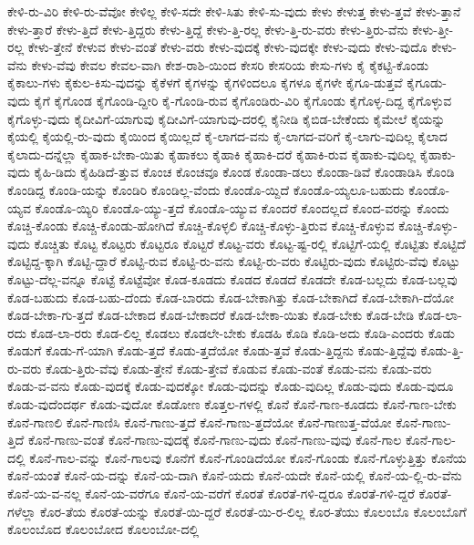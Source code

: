{ಕೇಳಿ-ರು-ವಿರಿ
ಕೇಳಿ-ರು-ವೆವೋ
ಕೇಳಿಲ್ಲ
ಕೇಳಿ-ಸದೇ
ಕೇಳಿ-ಸಿತು
ಕೇಳಿ-ಸು-ವುದು
ಕೇಳು
ಕೇಳುತ್ತ
ಕೇಳು-ತ್ತವೆ
ಕೇಳು-ತ್ತಾನೆ
ಕೇಳು-ತ್ತಾರೆ
ಕೇಳು-ತ್ತಿದೆ
ಕೇಳು-ತ್ತಿದ್ದರು
ಕೇಳು-ತ್ತಿದ್ದೆ
ಕೇಳು-ತ್ತಿ-ರಲ್ಲ
ಕೇಳು-ತ್ತಿ-ರು-ವರು
ಕೇಳು-ತ್ತಿರು-ವೆನು
ಕೇಳು-ತ್ತೀ-ರಲ್ಲ
ಕೇಳು-ತ್ತೇನೆ
ಕೇಳುವ
ಕೇಳು-ವಂತೆ
ಕೇಳು-ವರು
ಕೇಳು-ವುದಕ್ಕೆ
ಕೇಳು-ವುದಕ್ಕೇ
ಕೇಳು-ವುದು
ಕೇಳು-ವುದೊ
ಕೇಳು-ವೆನು
ಕೇಳು-ವೆವು
ಕೇವಲ
ಕೇವಲ-ವಾಗಿ
ಕೇಶ-ರಾಶಿ-ಯಿಂದ
ಕೇಸರಿ
ಕೇಸರಿಯ
ಕೇಸು-ಗಳು
ಕೈ
ಕೈಕಟ್ಟಿ-ಕೊಂಡು
ಕೈಕಾಲು-ಗಳು
ಕೈಕುಲ-ಕಿಸು-ವುದನ್ನು
ಕೈಕೆಳಗೆ
ಕೈಗಳನ್ನು
ಕೈಗಳಿಂದಲೂ
ಕೈಗಳೂ
ಕೈಗಳೇ
ಕೈಗೂ-ಡುತ್ತವೆ
ಕೈಗೂಡು-ವುದು
ಕೈಗೆ
ಕೈಗೊಂಡ
ಕೈಗೊಂಡಿ-ದ್ದೀರಿ
ಕೈ-ಗೊಂಡಿ-ರುವ
ಕೈಗೊಂಡಿರು-ವಿರಿ
ಕೈಗೊಂಡು
ಕೈಗೊಳ್ಳ-ದಿದ್ದ
ಕೈಗೊಳ್ಳುವ
ಕೈಗೊಳ್ಳು-ವುದು
ಕೈದೀವಿಗೆ-ಯಾಗುವು
ಕೈದೀವಿಗೆ-ಯಾಗುವು-ದರಲ್ಲಿ
ಕೈನೀಡಿ
ಕೈಬಿಡ-ಬೇಕೆಂದು
ಕೈಮೇಲೆ
ಕೈಯನ್ನು
ಕೈಯಲ್ಲಿ
ಕೈಯಲ್ಲಿ-ರು-ವುದು
ಕೈಯಿಂದ
ಕೈಯಿಲ್ಲದೆ
ಕೈ-ಲಾಗದ-ವನು
ಕೈ-ಲಾಗದ-ವರಿಗೆ
ಕೈ-ಲಾಗು-ವುದಿಲ್ಲ
ಕೈಲಾದ
ಕೈಲಾದು-ದನ್ನೆಲ್ಲಾ
ಕೈಹಾಕ-ಬೇಕಾ-ಯಿತು
ಕೈಹಾಕಲು
ಕೈಹಾಕಿ
ಕೈಹಾಕಿ-ದರೆ
ಕೈಹಾಕಿ-ರುವ
ಕೈಹಾಕು-ವುದಿಲ್ಲ
ಕೈಹಾಕು-ವುದು
ಕೈಹಿ-ಡಿದು
ಕೈಹಿಡಿದೆ-ತ್ತುವ
ಕೊಂಚ
ಕೊಂಚವೂ
ಕೊಂಡ
ಕೊಂಡಾ-ಡಲು
ಕೊಂಡಾ-ಡಿವೆ
ಕೊಂಡಾಡಿಸಿ
ಕೊಂಡಿ
ಕೊಂಡಿದ್ದ
ಕೊಂಡಿ-ಯನ್ನು
ಕೊಂಡಿರಿ
ಕೊಂಡಿಲ್ಲ-ವೆಂದು
ಕೊಂಡೊ-ಯ್ದಿದೆ
ಕೊಂಡೊ-ಯ್ಯಲೂ-ಬಹುದು
ಕೊಂಡೊ-ಯ್ಯವ
ಕೊಂಡೊ-ಯ್ಯಿರಿ
ಕೊಂಡೊ-ಯ್ಯು-ತ್ತದೆ
ಕೊಂಡೊ-ಯ್ಯುವ
ಕೊಂದರೆ
ಕೊಂದಲ್ಲದೆ
ಕೊಂದ-ವರನ್ನು
ಕೊಂದು
ಕೊಚ್ಚಿ-ಕೊಂಡು
ಕೊಚ್ಚಿ-ಕೊಂಡು-ಹೋಗಿದೆ
ಕೊಚ್ಚಿ-ಕೊಳ್ಳಲಿ
ಕೊಚ್ಚಿ-ಕೊಳ್ಳು-ತ್ತಿರುವ
ಕೊಚ್ಚಿ-ಕೊಳ್ಳುವ
ಕೊಚ್ಚಿ-ಕೊಳ್ಳು-ವುದು
ಕೊಚ್ಚಿತು
ಕೊಟ್ಟ
ಕೊಟ್ಟರು
ಕೊಟ್ಟರೂ
ಕೊಟ್ಟರೆ
ಕೊಟ್ಟ-ವರು
ಕೊಟ್ಟ-ಷ್ಟ-ರಲ್ಲಿ
ಕೊಟ್ಟಿಗೆ-ಯಲ್ಲಿ
ಕೊಟ್ಟಿತು
ಕೊಟ್ಟಿದೆ
ಕೊಟ್ಟಿದ್ದ-ಕ್ಕಾಗಿ
ಕೊಟ್ಟಿ-ದ್ದಾರೆ
ಕೊಟ್ಟಿ-ರುವ
ಕೊಟ್ಟಿ-ರು-ವನು
ಕೊಟ್ಟಿ-ರು-ವರು
ಕೊಟ್ಟಿರು-ವುದು
ಕೊಟ್ಟಿರು-ವೆವು
ಕೊಟ್ಟು
ಕೊಟ್ಟು-ದೆಲ್ಲ-ವನ್ನೂ
ಕೊಟ್ಟೆ
ಕೊಟ್ಟೆವೋ
ಕೊಡ-ಕೂಡದು
ಕೊಡದ
ಕೊಡದೆ
ಕೊಡದೇ
ಕೊಡ-ಬಲ್ಲದು
ಕೊಡ-ಬಲ್ಲವು
ಕೊಡ-ಬಹುದು
ಕೊಡ-ಬಹು-ದೆಂದು
ಕೊಡ-ಬಾರದು
ಕೊಡ-ಬೇಕಾಗಿತ್ತು
ಕೊಡ-ಬೇಕಾಗಿದೆ
ಕೊಡ-ಬೇಕಾಗಿ-ದೆಯೋ
ಕೊಡ-ಬೇಕಾ-ಗು-ತ್ತದೆ
ಕೊಡ-ಬೇಕಾದ
ಕೊಡ-ಬೇಕಾದರೆ
ಕೊಡ-ಬೇಕಾ-ಯಿತು
ಕೊಡ-ಬೇಕು
ಕೊಡ-ಬೇಡಿ
ಕೊಡ-ಲಾ-ರದು
ಕೊಡ-ಲಾ-ರರು
ಕೊಡ-ಲಿಲ್ಲ
ಕೊಡಲು
ಕೊಡಲೇ-ಬೇಕು
ಕೊಡಹಿ
ಕೊಡಿ
ಕೊಡಿ-ಅದು
ಕೊಡಿ-ಎಂದರು
ಕೊಡು
ಕೊಡುಗೆ
ಕೊಡು-ಗೆ-ಯಾಗಿ
ಕೊಡು-ತ್ತದೆ
ಕೊಡು-ತ್ತದೆಯೋ
ಕೊಡು-ತ್ತವೆ
ಕೊಡು-ತ್ತಿದ್ದನು
ಕೊಡು-ತ್ತಿದ್ದೆವು
ಕೊಡು-ತ್ತಿ-ರು-ವರು
ಕೊಡು-ತ್ತಿರು-ವೆವು
ಕೊಡು-ತ್ತೇನೆ
ಕೊಡು-ತ್ತೇವೆ
ಕೊಡುವ
ಕೊಡು-ವಂತೆ
ಕೊಡು-ವನು
ಕೊಡು-ವರು
ಕೊಡು-ವ-ವನು
ಕೊಡು-ವುದಕ್ಕೆ
ಕೊಡು-ವುದಕ್ಕೋ
ಕೊಡು-ವುದನ್ನು
ಕೊಡು-ವುದಿಲ್ಲ
ಕೊಡು-ವುದು
ಕೊಡು-ವುದೂ
ಕೊಡು-ವುದೆಂದರ್ಥ
ಕೊಡು-ವುದೋ
ಕೊಡೋಣ
ಕೊತ್ತಲ-ಗಳಲ್ಲಿ
ಕೊನೆ
ಕೊನೆ-ಗಾಣ-ಕೂಡದು
ಕೊನೆ-ಗಾಣ-ಬೇಕು
ಕೊನೆ-ಗಾಣಲಿ
ಕೊನೆ-ಗಾಣಿಸಿ
ಕೊನೆ-ಗಾಣು-ತ್ತದೆ
ಕೊನೆ-ಗಾಣು-ತ್ತದೆಯೋ
ಕೊನೆ-ಗಾಣುತ್ತ-ವೆಯೋ
ಕೊನೆ-ಗಾಣು-ತ್ತಿದೆ
ಕೊನೆ-ಗಾಣು-ವಂತೆ
ಕೊನೆ-ಗಾಣು-ವುದಕ್ಕೆ
ಕೊನೆ-ಗಾಣು-ವುದು
ಕೊನೆ-ಗಾಣು-ವುವು
ಕೊನೆ-ಗಾಲ
ಕೊನೆ-ಗಾಲ-ದಲ್ಲಿ
ಕೊನೆ-ಗಾಲ-ವನ್ನು
ಕೊನೆ-ಗಾಲವು
ಕೊನೆಗೆ
ಕೊನೆ-ಗೊಂಡಿದೆಯೋ
ಕೊನೆ-ಗೊಂಡು
ಕೊನೆ-ಗೊಳ್ಳುತ್ತಿತ್ತು
ಕೊನೆಯ
ಕೊನೆ-ಯಂತೆ
ಕೊನೆ-ಯ-ದನ್ನು
ಕೊನೆ-ಯ-ದಾಗಿ
ಕೊನೆ-ಯದು
ಕೊನೆ-ಯದೇ
ಕೊನೆ-ಯಲ್ಲಿ
ಕೊನೆ-ಯ-ಲ್ಲಿ-ರು-ವೆನು
ಕೊನೆ-ಯ-ವ-ನಲ್ಲ
ಕೊನೆ-ಯ-ವರೆಗೂ
ಕೊನೆ-ಯ-ವರೆಗೆ
ಕೊರತೆ
ಕೊರತೆ-ಗಳಿ-ದ್ದರೂ
ಕೊರತೆ-ಗಳಿ-ದ್ದರೆ
ಕೊರತೆ-ಗಳೆಲ್ಲಾ
ಕೊರ-ತೆಯ
ಕೊರತೆ-ಯನ್ನು
ಕೊರತೆ-ಯಿ-ದ್ದರೆ
ಕೊರತೆ-ಯಿ-ರ-ಲಿಲ್ಲ
ಕೊರ-ತೆಯು
ಕೊಲಂಬೊ
ಕೊಲಂಬೊಗೆ
ಕೊಲಂಬೊದ
ಕೊಲಂಬೋದ
ಕೊಲಂಬೋ-ದಲ್ಲಿ
}
